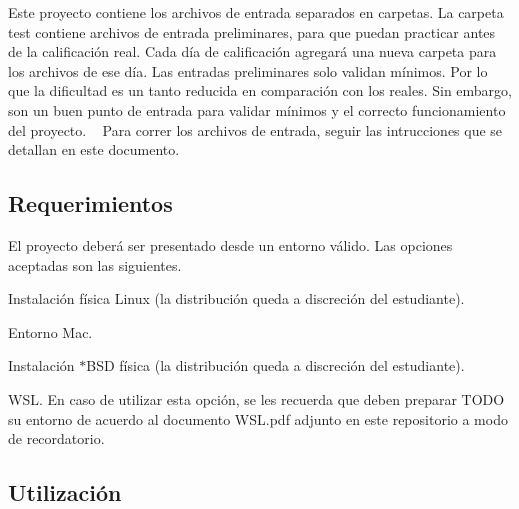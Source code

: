 Este proyecto contiene los archivos de entrada separados en carpetas. La carpeta {\ttfamily test} contiene archivos de entrada preliminares, para que puedan practicar antes de la calificación real. Cada día de calificación agregará una nueva carpeta para los archivos de ese día. Las entradas preliminares solo validan mínimos. Por lo que la dificultad es un tanto reducida en comparación con los reales. Sin embargo, son un buen punto de entrada para validar mínimos y el correcto funcionamiento del proyecto. ~\newline
 Para correr los archivos de entrada, seguir las intrucciones que se detallan en este documento.

\subsection*{Requerimientos}

El proyecto deberá ser presentado desde un entorno válido. Las opciones aceptadas son las siguientes.
\begin{DoxyItemize}
\item Instalación física Linux (la distribución queda a discreción del estudiante).
\item Entorno Mac.
\item Instalación $\ast$\+B\+SD física (la distribución queda a discreción del estudiante).
\item W\+SL. En caso de utilizar esta opción, se les recuerda que deben preparar T\+O\+DO su entorno de acuerdo al documento W\+S\+L.\+pdf adjunto en este repositorio a modo de recordatorio.
\end{DoxyItemize}

\subsection*{Utilización}

